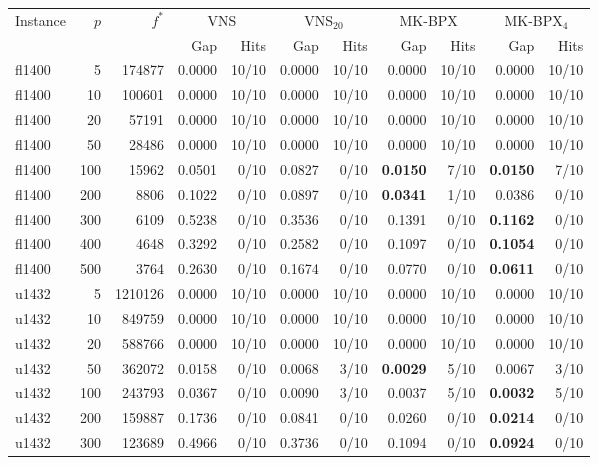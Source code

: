 \begin{tabular}{lrrrrrrrrrr}
\toprule
Instance & $p$ & $f^*$ & \multicolumn{2}{c}{VNS} & \multicolumn{2}{c}{VNS$_{20}$} & \multicolumn{2}{c}{MK-BPX} & \multicolumn{2}{c}{MK-BPX$_{4}$} \\
\cmidrule(lr){4-5}\cmidrule(lr){6-7}\cmidrule(lr){8-9}\cmidrule(lr){10-11}
 & &  & Gap & Hits & Gap & Hits & Gap & Hits & Gap & Hits \\
\midrule
fl1400 & 5 & 174877 & 0.0000 & 10/10 & 0.0000 & 10/10 & 0.0000 & 10/10 & 0.0000 & 10/10 \\
fl1400 & 10 & 100601 & 0.0000 & 10/10 & 0.0000 & 10/10 & 0.0000 & 10/10 & 0.0000 & 10/10 \\
fl1400 & 20 & 57191 & 0.0000 & 10/10 & 0.0000 & 10/10 & 0.0000 & 10/10 & 0.0000 & 10/10 \\
fl1400 & 50 & 28486 & 0.0000 & 10/10 & 0.0000 & 10/10 & 0.0000 & 10/10 & 0.0000 & 10/10 \\
fl1400 & 100 & 15962 & 0.0501 & 0/10 & 0.0827 & 0/10 & \textbf{0.0150} & 7/10 & \textbf{0.0150} & 7/10 \\
fl1400 & 200 & 8806 & 0.1022 & 0/10 & 0.0897 & 0/10 & \textbf{0.0341} & 1/10 & 0.0386 & 0/10 \\
fl1400 & 300 & 6109 & 0.5238 & 0/10 & 0.3536 & 0/10 & 0.1391 & 0/10 & \textbf{0.1162} & 0/10 \\
fl1400 & 400 & 4648 & 0.3292 & 0/10 & 0.2582 & 0/10 & 0.1097 & 0/10 & \textbf{0.1054} & 0/10 \\
fl1400 & 500 & 3764 & 0.2630 & 0/10 & 0.1674 & 0/10 & 0.0770 & 0/10 & \textbf{0.0611} & 0/10 \\
\addlinespace[2pt]
u1432 & 5 & 1210126 & 0.0000 & 10/10 & 0.0000 & 10/10 & 0.0000 & 10/10 & 0.0000 & 10/10 \\
u1432 & 10 & 849759 & 0.0000 & 10/10 & 0.0000 & 10/10 & 0.0000 & 10/10 & 0.0000 & 10/10 \\
u1432 & 20 & 588766 & 0.0000 & 10/10 & 0.0000 & 10/10 & 0.0000 & 10/10 & 0.0000 & 10/10 \\
u1432 & 50 & 362072 & 0.0158 & 0/10 & 0.0068 & 3/10 & \textbf{0.0029} & 5/10 & 0.0067 & 3/10 \\
u1432 & 100 & 243793 & 0.0367 & 0/10 & 0.0090 & 3/10 & 0.0037 & 5/10 & \textbf{0.0032} & 5/10 \\
u1432 & 200 & 159887 & 0.1736 & 0/10 & 0.0841 & 0/10 & 0.0260 & 0/10 & \textbf{0.0214} & 0/10 \\
u1432 & 300 & 123689 & 0.4966 & 0/10 & 0.3736 & 0/10 & 0.1094 & 0/10 & \textbf{0.0924} & 0/10 \\

\end{tabular}
